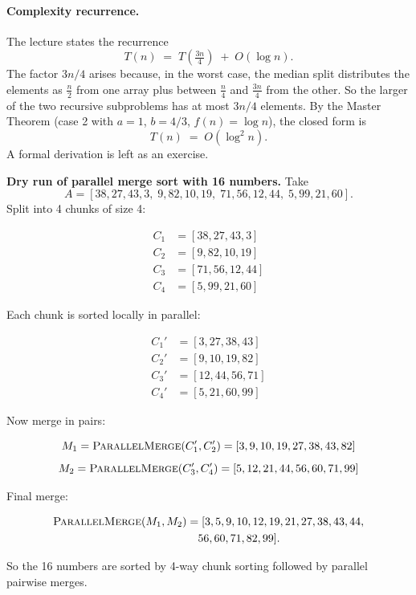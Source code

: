 \paragraph{Complexity recurrence.}
The lecture states the recurrence
\[
  T(n) \;=\; T\!\left(\tfrac{3n}{4}\right) \;+\; O(\log n).
\]
The factor $3n/4$ arises because, in the worst case, the median split
distributes the elements as $\tfrac{n}{2}$ from one array plus
between $\tfrac{n}{4}$ and $\tfrac{3n}{4}$ from the other.  So the
larger of the two recursive subproblems has at most $3n/4$ elements.
By the Master Theorem (case 2 with $a = 1$, $b = 4/3$, $f(n) = \log n$),
the closed form is
\[
  T(n) \;=\; O(\log^2 n).
\]
A formal derivation is left as an exercise.
\begin{ppexample}
\textbf{Dry run of parallel merge sort with 16 numbers.}
Take
\[
A = [38, 27, 43, 3,\; 9, 82, 10, 19,\; 71, 56, 12, 44,\; 5, 99, 21, 60].
\]
Split into 4 chunks of size 4:

\[
\begin{aligned}
C_1 &= [38,27,43,3] \\
C_2 &= [9,82,10,19] \\
C_3 &= [71,56,12,44] \\
C_4 &= [5,99,21,60]
\end{aligned}
\]

Each chunk is sorted locally in parallel:

\[
\begin{aligned}
C_1' &= [3,27,38,43] \\
C_2' &= [9,10,19,82] \\
C_3' &= [12,44,56,71] \\
C_4' &= [5,21,60,99]
\end{aligned}
\]

Now merge in pairs:

\[
M_1 = \textsc{ParallelMerge}(C_1', C_2') = [3,9,10,19,27,38,43,82]
\]
\[
M_2 = \textsc{ParallelMerge}(C_3', C_4') = [5,12,21,44,56,60,71,99]
\]

Final merge:

\[
\begin{aligned}
\textsc{ParallelMerge}(M_1, M_2)
&= [3,5,9,10,12,19,21,27,38,43,44,\\
&\quad 56,60,71,82,99].
\end{aligned}
\]

So the 16 numbers are sorted by 4-way chunk sorting followed by parallel pairwise merges.
\end{ppexample}

